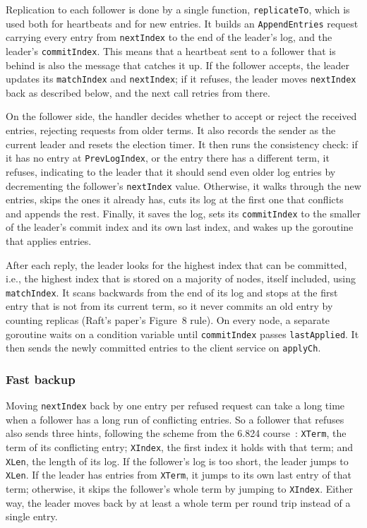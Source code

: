 \documentclass[conference]{IEEEtran}
\begin{document}
Replication to each follower is done by a single function, \texttt{replicateTo}, which is used both for heartbeats and for new entries. It builds an \texttt{AppendEntries} request carrying every entry from \texttt{nextIndex} to the end of the leader's log, and the leader's \texttt{commitIndex}. This means that a heartbeat sent to a follower that is behind is also the message that catches it up. If the follower accepts, the leader updates its \texttt{matchIndex} and \texttt{nextIndex}; if it refuses, the leader moves \texttt{nextIndex} back as described below, and the next call retries from there.

On the follower side, the handler decides whether to accept or reject the received entries, rejecting requests from older terms. It also records the sender as the current leader and resets the election timer. It then runs the consistency check: if it has no entry at \texttt{PrevLogIndex}, or the entry there has a different term, it refuses, indicating to the leader that it should send even older log entries by decrementing the follower's \texttt{nextIndex} value. Otherwise, it walks through the new entries, skips the ones it already has, cuts its log at the first one that conflicts and appends the rest. Finally, it saves the log, sets its \texttt{commitIndex} to the smaller of the leader's commit index and its own last index, and wakes up the goroutine that applies entries.

After each reply, the leader looks for the highest index that can be committed, i.e., the highest index that is stored on a majority of nodes, itself included, using \texttt{matchIndex}.
It scans backwards from the end of its log and stops at the first entry that is not from its current term, so it never commits an old entry by counting replicas (Raft's paper's Figure~8 rule).
On every node, a separate goroutine waits on a condition variable until \texttt{commitIndex} passes \texttt{lastApplied}.
It then sends the newly committed entries to the client service on \texttt{applyCh}.

\subsubsection{\textbf{Fast backup}} Moving \texttt{nextIndex} back by one entry per refused request can take a long time when a follower has a long run of conflicting entries. So a follower that refuses also sends three hints, following the scheme from the 6.824 course~\cite{mit6824}: \texttt{XTerm}, the term of its conflicting entry; \texttt{XIndex}, the first index it holds with that term; and \texttt{XLen}, the length of its log. If the follower's log is too short, the leader jumps to \texttt{XLen}. If the leader has entries from \texttt{XTerm}, it jumps to its own last entry of that term; otherwise, it skips the follower's whole term by jumping to \texttt{XIndex}. Either way, the leader moves back by at least a whole term per round trip instead of a single entry.
\end{document}
